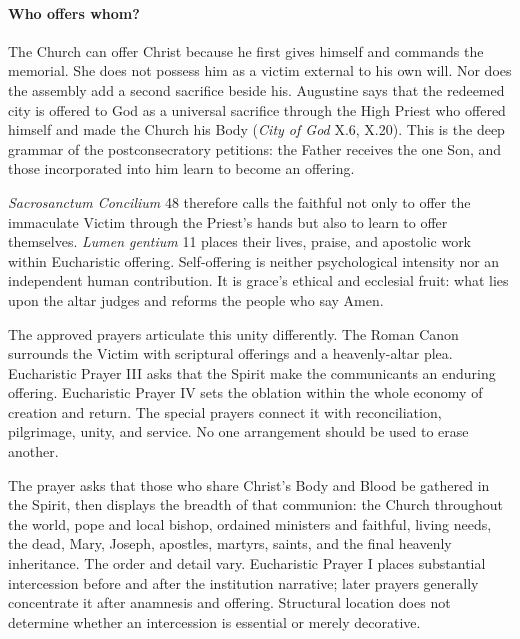 \paragraph{Who offers whom?}
The Church can offer Christ because he first gives himself and commands the memorial. She does not possess him as a victim external to his own will. Nor does the assembly add a second sacrifice beside his. Augustine says that the redeemed city is offered to God as a universal sacrifice through the High Priest who offered himself and made the Church his Body (\emph{City of God} X.6, X.20). This is the deep grammar of the postconsecratory petitions: the Father receives the one Son, and those incorporated into him learn to become an offering.

\emph{Sacrosanctum Concilium} 48 therefore calls the faithful not only to offer the immaculate Victim through the Priest's hands but also to learn to offer themselves. \emph{Lumen gentium} 11 places their lives, praise, and apostolic work within Eucharistic offering. Self-offering is neither psychological intensity nor an independent human contribution. It is grace's ethical and ecclesial fruit: what lies upon the altar judges and reforms the people who say Amen.

The approved prayers articulate this unity differently. The Roman Canon surrounds the Victim with scriptural offerings and a heavenly-altar plea. Eucharistic Prayer III asks that the Spirit make the communicants an enduring offering. Eucharistic Prayer IV sets the oblation within the whole economy of creation and return. The special prayers connect it with reconciliation, pilgrimage, unity, and service. No one arrangement should be used to erase another.


The prayer asks that those who share Christ's Body and Blood be gathered in the Spirit, then displays the breadth of that communion: the Church throughout the world, pope and local bishop, ordained ministers and faithful, living needs, the dead, Mary, Joseph, apostles, martyrs, saints, and the final heavenly inheritance. The order and detail vary. Eucharistic Prayer I places substantial intercession before and after the institution narrative; later prayers generally concentrate it after anamnesis and offering. Structural location does not determine whether an intercession is essential or merely decorative.

